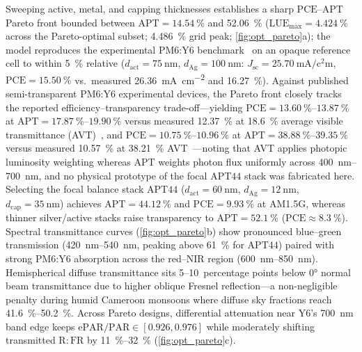 \documentclass[preprint,12pt,a4paper]{elsarticle}
\begin{document}
Sweeping active, metal, and capping thicknesses establishes a sharp $\mathrm{PCE}$--$\mathrm{APT}$ Pareto front bounded between $\mathrm{APT}=\qty{14.54}{\percent}$ and \qty{52.06}{\percent} ($\mathrm{LUE}_{\max}=\qty{4.424}{\percent}$ across the Pareto-optimal subset; \qty{4.486}{\percent} grid peak; \cref{fig:opt_pareto}a); the model reproduces the experimental PM6:Y6 benchmark~\cite{Shen2025NatCommun} on an opaque reference cell to within \qty{5}{\percent} relative ($d_{\mathrm{act}}=\qty{75}{\nano\meter}$, $d_{\mathrm{Ag}}=\qty{100}{\nano\meter}$: $J_{\mathrm{sc}}=\qty{25.70}{\milli\ampere\per\square\centi\meter}$, $\mathrm{PCE}=\qty{15.50}{\percent}$ vs.\ measured \qty{26.36}{\milli\ampere\per\square\centi\meter} and \qty{16.27}{\percent}). Against published semi-transparent PM6:Y6 experimental devices, the Pareto front closely tracks the reported efficiency--transparency trade-off---yielding $\mathrm{PCE}=\qtyrange{13.60}{13.87}{\percent}$ at $\mathrm{APT}=\qtyrange{17.87}{19.90}{\percent}$ versus measured \qty{12.37}{\percent} at \qty{18.6}{\percent} average visible transmittance (AVT)~\cite{Hu2020SciBull}, and $\mathrm{PCE}=\qtyrange{10.75}{10.96}{\percent}$ at $\mathrm{APT}=\qtyrange{38.88}{39.35}{\percent}$ versus measured \qty{10.57}{\percent} at \qty{38.21}{\percent} AVT~\cite{Xue2025AFM}---noting that AVT applies photopic luminosity weighting whereas APT weights photon flux uniformly across \qtyrange{400}{700}{\nano\meter}, and no physical prototype of the focal $\mathrm{APT44}$ stack was fabricated here. Selecting the focal balance stack $\mathrm{APT44}$ ($d_{\mathrm{act}}=\qty{60}{\nano\meter}$, $d_{\mathrm{Ag}}=\qty{12}{\nano\meter}$, $d_{\mathrm{cap}}=\qty{35}{\nano\meter}$) achieves $\mathrm{APT}=\qty{44.12}{\percent}$ and $\mathrm{PCE}=\qty{9.93}{\percent}$ at AM1.5G, whereas thinner silver/active stacks raise transparency to $\mathrm{APT}=\qty{52.1}{\percent}$ ($\mathrm{PCE}\approx \qty{8.3}{\percent}$). Spectral transmittance curves (\cref{fig:opt_pareto}b) show pronounced blue--green transmission (\qtyrange{420}{540}{\nano\meter}, peaking above \qty{61}{\percent} for $\mathrm{APT44}$) paired with strong PM6:Y6 absorption across the red--NIR region (\qtyrange{600}{850}{\nano\meter}). Hemispherical diffuse transmittance sits \numrange{5}{10}~percentage points below \ang{0} normal beam transmittance due to higher oblique Fresnel reflection---a non-negligible penalty during humid Cameroon monsoons where diffuse sky fractions reach \qtyrange{41.6}{50.2}{\percent}. Across Pareto designs, differential attenuation near Y6's \qty{700}{\nano\meter} band edge keeps $\mathrm{ePAR}/\mathrm{PAR} \in [\num{0.926}, \num{0.976}]$ while moderately shifting transmitted $\mathrm{R{:}FR}$ by \qtyrange{+11}{+32}{\percent} (\cref{fig:opt_pareto}c).
\end{document}

